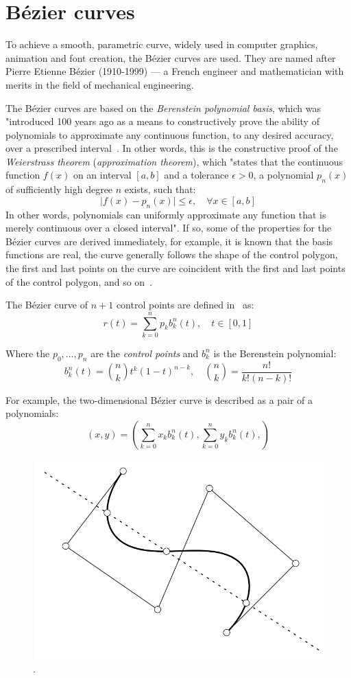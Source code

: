 \section{Bézier curves}\label{sec:bezier-curves}
To achieve a smooth, parametric curve, widely used in computer graphics, animation and font creation, the Bézier curves are used.
They are named after Pierre Etienne Bézier (1910-1999) --- a French engineer and mathematician with merits in the field of mechanical engineering.

The Bézier curves are based on the \textit{Berenstein polynomial basis}, which was "introduced 100 years ago as a means to constructively prove the ability of polynomials to approximate any continuous function, to any desired accuracy, over a prescribed interval~\cite{farouki2012bernstein}.
In other words, this is the constructive proof of the \textit{Weierstrass theorem} (\textit{approximation theorem}), which "states that the continuous function $f(x)$ on an interval $[a, b]$ and a tolerance $\epsilon > 0$, a polynomial $p_n(x)$ of sufficiently high degree $n$ exists, such that:
\[
    \mid f(x) - p_n(x) \mid \leq \epsilon, \quad \forall x \in \left[ a,b \right]
\]
In other words, polynomials can uniformly approximate any function that is merely continuous over a closed interval"\cite{farouki2012bernstein}.
If so, some of the properties for the Bézier curves are derived immediately, for example, it is known that the basis functions are real, the curve generally follows the shape of the control polygon, the first and last points on the curve are coincident with the first and last points of the control polygon, and so on~\cite{bezier-curves}.

The Bézier curve of $n+1$ control points are defined in~\cite{farouki2012bernstein} as:
\[
    r(t) = \sum_{k=0}^n p_k b_k^n(t),  \quad t \in [0,1]
\]

Where the $p_0,\dots,p_n$ are the \textit{control points} and $b_k^n$ is the Berenstein polynomial:
\[
    b_k^n(t) = \binom{n}{k} t^k (1-t)^{n-k}, \quad \binom{n}{k} = \frac{n!}{k!(n-k)!}
\]

For example, the two-dimensional Bézier curve is described as a pair of a polynomials:
\[
    (x,y) = \left( \sum_{k=0}^n x_{k} b_k^n(t), \sum_{k=0}^n y_{k} b_k^n(t), \right)
\]

\begin{figure}[h!]
    \centering
    \includegraphics[width=0.4\linewidth,scale=0.4]{resources/bezier-curve-example.png}
    .
    \label{fig:bezier-example}
\end{figure}

